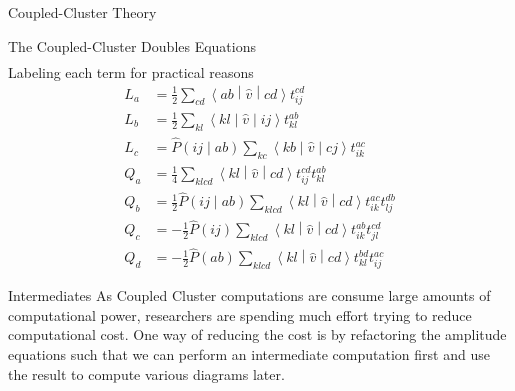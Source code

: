\documentclass[twoside,english]{uiofysmaster}
\begin{document}
\begin{chapter}{Coupled-Cluster Theory}
\begin{section}{The Coupled-Cluster Doubles Equations}
\begin{align}
  		\end{align}
  		Labeling each term for practical reasons	
  		\begin{align}
  			L_a &= \frac{1}{2} \sum_{cd}\left<ab\middle|\hat v\middle|cd\right>t_{ij}^{cd} \\
  			L_b &= \frac{1}{2} \sum_{kl} \left<kl\middle|\hat v\middle|ij\right>t_{kl}^{ab} \\
  			L_c &= \hat P\left(ij\middle|ab\right) \sum_{kc}\left<kb\middle|\hat v\middle|cj\right>t_{ik}^{ac} \\
  			Q_a &= \frac{1}{4} \sum_{klcd}\left<kl\middle|\hat v\middle|cd\right>t_{ij}^{cd} t_{kl}^{ab} \\
  			Q_b &= \frac{1}{2} \hat P\left(ij\middle|ab\right) \sum_{klcd}\left<kl\middle|\hat v\middle|cd\right>t_{ik}^{ac} t_{lj}^{db} \\
  			Q_c &= - \frac{1}{2}\hat P(ij) \sum_{klcd}\left<kl\middle|\hat v\middle|cd\right>t_{ik}^{ab} t_{jl}^{cd} \\
  			Q_d &= - \frac{1}{2}\hat P(ab) \sum_{klcd}\left<kl\middle|\hat v\middle|cd\right>t_{kl}^{bd} t_{ij}^{ac}
  		\end{align}
   	\end{section}

  	\begin{section}{Intermediates}
  		As Coupled Cluster computations are consume large amounts of computational power, researchers are spending much effort trying to reduce computational cost. One way of reducing the cost is by refactoring the amplitude equations such that we can perform an intermediate computation first and use the result to compute various diagrams later. 


\end{section}
\end{chapter}
\end{document}
